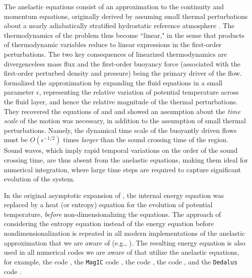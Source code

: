 \documentclass[12pt]{article}
\begin{document}
	The anelastic equations consist of an approximation to the continuity and momentum equations, originally derived by assuming small thermal perturbations about a nearly adiabatically stratified hydrostatic reference atmosphere \citep{Batchelor1953,Charney1960}. The thermodynamics of the problem thus become ``linear," in the sense that products of thermodynamic variables reduce to linear expressions in the first-order perturbations. The two key consequences of linearized thermodynamics are divergenceless mass flux and the first-order buoyancy force (associated with the first-order perturbed density and pressure) being the primary driver of the flow. \citet{Ogura1962} formalized the approximation by expanding the fluid equations in a small parameter $\epsilon$, representing the relative variation of potential temperature across the fluid layer, and hence the relative magnitude of the thermal perturbations. They recovered the equations of \citet{Batchelor1953} and \citet{Charney1960} and showed an assumption about the \textit{time scale} of the motion was necessary, in addition to the assumption of small thermal perturbations. Namely, the dynamical time scale of the buoyantly driven flows must be $O(\epsilon^{-1/2})$ times \textit{larger} than the sound crossing time of the region. Sound waves, which imply rapid temporal variations on the order of the sound crossing time, are thus absent from the anelastic equations, making them ideal for numerical integration, where large time steps are required to capture significant evolution of the system. 
	
	In the original asymptotic expansion of \citet{Ogura1962}, the internal energy equation was replaced by a heat (or entropy) equation for the evolution of potential temperature, \textit{before} non-dimensionalizing the equations. The approach of considering the entropy equation instead of the energy equation before nondimensionalization is repeated in all modern implementations of the anelastic approximation that we are aware of (e.g., \citealt{Gilman1981,Lipps1982,Glatzmaier1984,Lantz1992,Braginsky1995,Lantz1999,Clune1999,Rogers2005,Brown2012,Vasil2013,Wilczyski2022}). The resulting energy equation is also used in all numerical codes we are aware of that utilize the anelastic equations, for example, the {\ash} code \citep{Brun2004}, the \texttt{MagIC} code \citep{Gastine2012}, the {\rayleigh} code \citep{Featherstone2016a,Featherstone2023}, the {\eulag} code \citep{Smolarkiewicz2004}, and the \texttt{Dedalus} code \citep{Burns2020,Brown2020}. 
	
\end{document}
